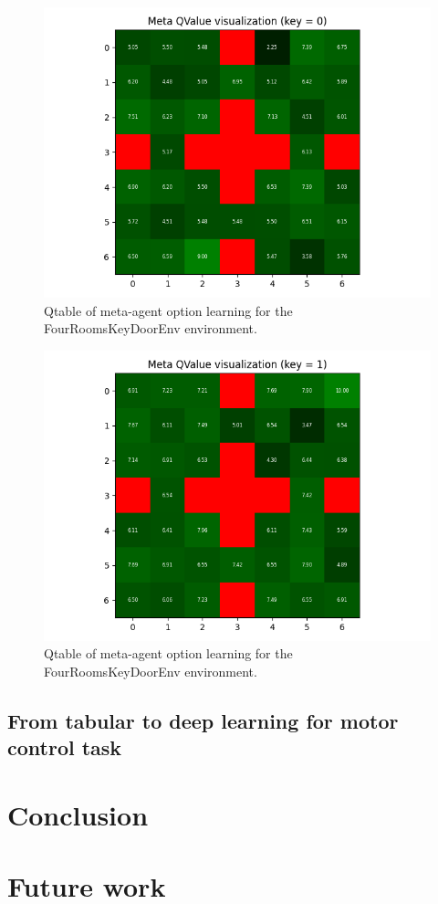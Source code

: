 \documentclass[conference]{IEEEtran}
\begin{document}
\begin{figure}[ht]
\centering
\includegraphics[width=0.9\columnwidth]{img/exp_option_her_qtable_small_key0.png}
\caption{Qtable of meta-agent option learning for the FourRoomsKeyDoorEnv environment.}
\label{fig:exp_option_her_qtable_small_key0}
\end{figure}

\begin{figure}[ht]
\centering
\includegraphics[width=0.9\columnwidth]{img/exp_option_her_qtable_small_key1.png}
\caption{Qtable of meta-agent option learning for the FourRoomsKeyDoorEnv environment.}
\label{fig:exp_option_her_qtable_small_key1}
\end{figure}

\subsection{From tabular to deep learning for motor control task}
\section{Conclusion} \label{sec:conclusion}
\section{Future work} \label{sec:future_work}

\newpage
\printbibliography
\end{document}
